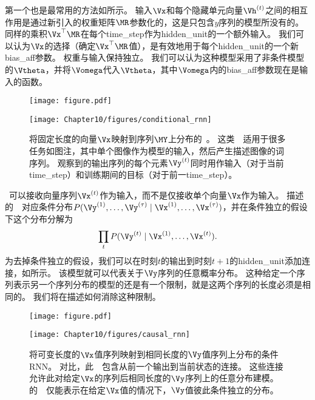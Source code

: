第一个也是最常用的方法如所示。
输入$\Vx$和每个隐藏单元向量$\Vh^{(t)}$之间的相互作用是通过新引入的权重矩阵$\MR$参数化的，这是只包含$y$序列的模型所没有的。
同样的乘积$\Vx^\top\MR$在每个\gls{time_step}作为\gls{hidden_unit}的一个额外输入。
我们可以认为$\Vx$的选择（确定$\Vx^\top\MR$值），是有效地用于每个\gls{hidden_unit}的一个新\gls{bias_aff}参数。
权重与输入保持独立。
我们可以认为这种模型采用了非条件模型的$\Vtheta$，并将$\Vomega$代入$\Vtheta$，其中$\Vomega$内的\gls{bias_aff}参数现在是输入的函数。

\begin{figure}[!htb]
\ifOpenSource
\centerline{\texttt{[image: figure.pdf]}}
\else
\centerline{\texttt{[image: Chapter10/figures/conditional\_rnn]}}
\fi
\caption{将固定长度的向量$\Vx$映射到序列$\MY$上分布的~。
这类~~适用于很多任务如图注，其中单个图像作为模型的输入，然后产生描述图像的词序列。
观察到的输出序列的每个元素$\Vy^{(t)}$同时用作输入（对于当前\gls{time_step}）和训练期间的目标（对于前一\gls{time_step}）。
}
\label{fig:chap10_conditional_rnn}
\end{figure}


~可以接收向量序列$\Vx^{(t)}$作为输入，而不是仅接收单个向量$\Vx$作为输入。
描述的~~对应条件分布$P(\Vy^{(1)}, \dots, \Vy^{(\tau)} \mid \Vx^{(1)}, \dots, \Vx^{(\tau)})$，并在条件独立的假设下这个分布分解为
\begin{align}
 \prod_t P(\Vy^{(t)} \mid \Vx^{(1)}, \dots, \Vx^{(t)}).
\end{align}
为去掉条件独立的假设，我们可以在时刻$t$的输出到时刻$t+1$的\gls{hidden_unit}添加连接，如所示。
该模型就可以代表关于$\Vy$序列的任意概率分布。
这种给定一个序列表示另一个序列分布的模型的还是有一个限制，就是这两个序列的长度必须是相同的。
我们将在描述如何消除这种限制。

\begin{figure}[!htb]
\ifOpenSource
\centerline{\texttt{[image: figure.pdf]}}
\else
\centerline{\texttt{[image: Chapter10/figures/causal\_rnn]}}
\fi
\caption{将可变长度的$\Vx$值序列映射到相同长度的$\Vy$值序列上分布的条件\gls{RNN}。
对比，此~~包含从前一个输出到当前状态的连接。
这些连接允许此对给定$\Vx$的序列后相同长度的$\Vy$序列上的任意分布建模。
的~~仅能表示在给定$\Vx$值的情况下，$\Vy$值彼此条件独立的分布。
}
\label{fig:chap10_causal_rnn}
\end{figure}


